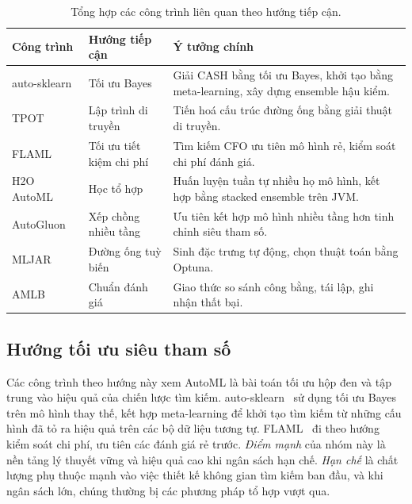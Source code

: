 \begin{table}[H]
  \centering
  \small
  \caption{Tổng hợp các công trình liên quan theo hướng tiếp cận.}
  \label{tab:relatedwork}
  \renewcommand{\arraystretch}{1.25}
  \begin{tabularx}{\linewidth}{@{}l l X@{}}
    \toprule
    \textbf{Công trình} & \textbf{Hướng tiếp cận} & \textbf{Ý tưởng chính} \\
    \midrule
    auto-sklearn~\cite{feurer2015autosklearn} & Tối ưu Bayes & Giải CASH bằng tối ưu Bayes, khởi tạo bằng meta-learning, xây dựng ensemble hậu kiểm. \\
    TPOT~\cite{olson2016tpot} & Lập trình di truyền & Tiến hoá cấu trúc đường ống bằng giải thuật di truyền. \\
    FLAML~\cite{wang2021flaml} & Tối ưu tiết kiệm chi phí & Tìm kiếm CFO ưu tiên mô hình rẻ, kiểm soát chi phí đánh giá. \\
    H2O AutoML~\cite{ledell2020h2o} & Học tổ hợp & Huấn luyện tuần tự nhiều họ mô hình, kết hợp bằng stacked ensemble trên JVM. \\
    AutoGluon~\cite{erickson2020autogluon} & Xếp chồng nhiều tầng & Ưu tiên kết hợp mô hình nhiều tầng hơn tinh chỉnh siêu tham số. \\
    MLJAR~\cite{plonska2021mljar} & Đường ống tuỳ biến & Sinh đặc trưng tự động, chọn thuật toán bằng Optuna. \\
    AMLB~\cite{gijsbers2024amlb} & Chuẩn đánh giá & Giao thức so sánh công bằng, tái lập, ghi nhận thất bại. \\
    \bottomrule
  \end{tabularx}
\end{table}

\subsection{Hướng tối ưu siêu tham số}
Các công trình theo hướng này xem AutoML là bài toán tối ưu hộp đen và tập trung
vào hiệu quả của chiến lược tìm kiếm. auto-sklearn~\cite{feurer2015autosklearn}
sử dụng tối ưu Bayes trên mô hình thay thế, kết hợp meta-learning để khởi tạo tìm
kiếm từ những cấu hình đã tỏ ra hiệu quả trên các bộ dữ liệu tương tự.
FLAML~\cite{wang2021flaml} đi theo hướng kiểm soát chi phí, ưu tiên các đánh giá
rẻ trước. \textit{Điểm mạnh} của nhóm này là nền tảng lý thuyết vững và hiệu quả
cao khi ngân sách hạn chế. \textit{Hạn chế} là chất lượng phụ thuộc mạnh vào việc
thiết kế không gian tìm kiếm ban đầu, và khi ngân sách lớn, chúng thường bị các
phương pháp tổ hợp vượt qua.


